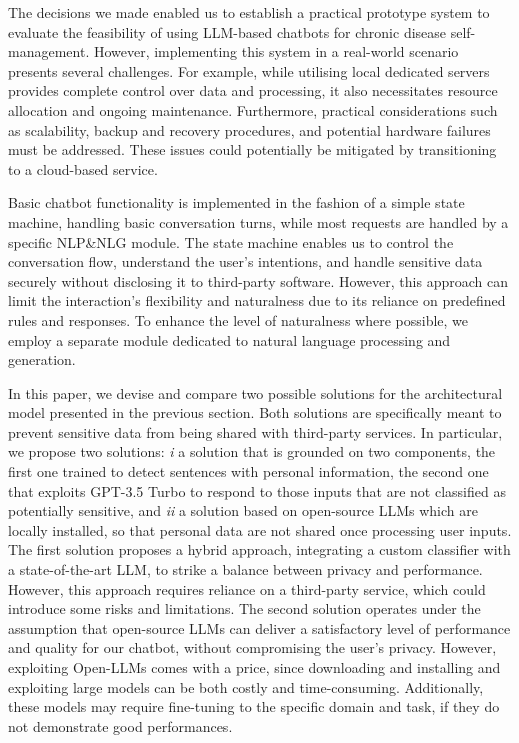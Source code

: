 \documentclass[preprint,12pt]{elsarticle}
\begin{document}
The decisions we made enabled us to establish a practical prototype system to evaluate the feasibility of using LLM-based chatbots for chronic disease self-management. However, implementing this system in a real-world scenario presents several challenges.
For example, while utilising local dedicated servers provides complete control over data and processing, it also necessitates resource allocation and ongoing maintenance. Furthermore, practical considerations such as scalability, backup and recovery procedures, and potential hardware failures must be addressed. These issues could potentially be mitigated by transitioning to a cloud-based service.

Basic chatbot functionality is implemented in the fashion of a simple state machine, handling basic conversation turns, while most requests are handled by a specific NLP\&NLG module.
The state machine enables us to control the conversation flow, understand the user’s intentions, and handle sensitive data securely without disclosing it to third-party software. However, this approach can limit the interaction’s flexibility and naturalness due to its reliance on predefined rules and responses. To enhance the level of naturalness where possible, we employ a separate module dedicated to natural language processing and generation.

In this paper, we devise and compare two possible solutions for the architectural model presented in the previous section.
%
Both solutions are specifically meant to prevent sensitive data from being shared with third-party services.
%
In particular, we propose two solutions: \emph{i} a solution that is grounded on two components, the first one trained to detect sentences with personal information, the second one that exploits GPT-3.5 Turbo to respond to those inputs that are not classified as potentially sensitive, and \emph{ii} a solution based on open-source LLMs which are locally installed, 
so that personal data are not shared once processing user inputs.
The first solution proposes a hybrid approach, integrating a custom classifier with a state-of-the-art LLM, to strike a balance between privacy and performance. However, this approach requires reliance on a third-party service, which could introduce some risks and limitations.
%
The second solution operates under the assumption that open-source LLMs can deliver a satisfactory level of performance and quality for our chatbot, without compromising the user’s privacy. However, exploiting Open-LLMs comes with a price, since downloading and installing and exploiting large models can be both costly and time-consuming. Additionally, these models may require fine-tuning to the specific domain and task, if they do not demonstrate good performances.
%
\end{document}
